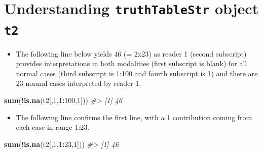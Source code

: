 \documentclass[]{book}
\newenvironment{Shaded}{\begin{snugshade}}{\end{snugshade}}
\newcommand{\CommentTok}[1]{\textcolor[rgb]{0.56,0.35,0.01}{\textit{#1}}}
\newcommand{\DataTypeTok}[1]{\textcolor[rgb]{0.13,0.29,0.53}{#1}}
\newcommand{\DecValTok}[1]{\textcolor[rgb]{0.00,0.00,0.81}{#1}}
\newcommand{\KeywordTok}[1]{\textcolor[rgb]{0.13,0.29,0.53}{\textbf{#1}}}
\newcommand{\NormalTok}[1]{#1}
\newcommand{\OperatorTok}[1]{\textcolor[rgb]{0.81,0.36,0.00}{\textbf{#1}}}
\newcommand{\OtherTok}[1]{\textcolor[rgb]{0.56,0.35,0.01}{#1}}
\newcommand{\StringTok}[1]{\textcolor[rgb]{0.31,0.60,0.02}{#1}}
\providecommand{\tightlist}{%
  \setlength{\itemsep}{0pt}\setlength{\parskip}{0pt}}
\begin{document}
\begin{Shaded}
\end{Shaded}

\hypertarget{understanding-truthtablestr-object-t2}{%
\section{\texorpdfstring{Understanding \texttt{truthTableStr} object \texttt{t2}}{Understanding truthTableStr object t2}}\label{understanding-truthtablestr-object-t2}}

\begin{itemize}
\tightlist
\item
  The following line below yields 46 (= 2x23) as reader 1 (second subscript) provides interpretations in both modalities (first subscript is blank) for all normal cases (third subscript is 1:100 and fourth subscript is 1) and there are 23 normal cases interpreted by reader 1.
\end{itemize}

\begin{Shaded}
\begin{Highlighting}[]
\KeywordTok{sum}\NormalTok{(}\OperatorTok{!}\KeywordTok{is.na}\NormalTok{(t2[,}\DecValTok{1}\NormalTok{,}\DecValTok{1}\OperatorTok{:}\DecValTok{100}\NormalTok{,}\DecValTok{1}\NormalTok{]))}
\CommentTok{#> [1] 46}
\end{Highlighting}
\end{Shaded}

\begin{itemize}
\tightlist
\item
  The following line confirms the first line, with a 1 contribution coming from each case in range 1:23.
\end{itemize}

\begin{Shaded}
\begin{Highlighting}[]
\KeywordTok{sum}\NormalTok{(}\OperatorTok{!}\KeywordTok{is.na}\NormalTok{(t2[,}\DecValTok{1}\NormalTok{,}\DecValTok{1}\OperatorTok{:}\DecValTok{23}\NormalTok{,}\DecValTok{1}\NormalTok{]))}
\CommentTok{#> [1] 46}
\end{Highlighting}
\end{Shaded}
\end{document}
